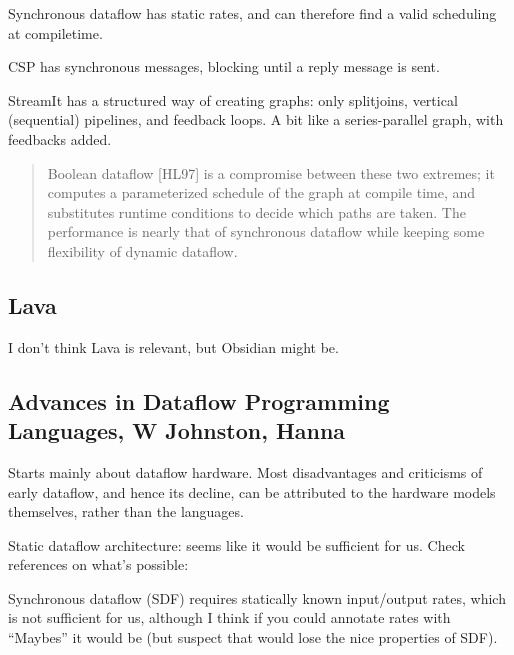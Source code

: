 Synchronous dataflow has static rates, and can therefore find a valid scheduling at compiletime.

CSP has synchronous messages, blocking until a reply message is sent.

StreamIt has a structured way of creating graphs: only splitjoins, vertical (sequential) pipelines, and feedback loops. A bit like a series-parallel graph, with feedbacks added.

\begin{quote}
Boolean dataflow [HL97] is a compromise between these two extremes; it computes a parameterized schedule
of the graph at compile time, and substitutes runtime conditions to decide which paths are taken.
The performance is nearly that of synchronous dataflow while keeping some flexibility of dynamic
dataflow.
\end{quote}


\subsection{Lava}
I don't think Lava is relevant, but Obsidian might be.

\subsection{Advances in Dataflow Programming Languages, W Johnston, Hanna}
Starts mainly about dataflow hardware\cite{johnston2004advances}.
Most disadvantages and criticisms of early dataflow, and hence its decline, can be attributed to the hardware models themselves, rather than the languages.

Static dataflow architecture:
seems like it would be sufficient for us. Check references on what's possible:

Synchronous dataflow (SDF) requires statically known input/output rates, which is not sufficient for us, although I think if you could annotate rates with ``Maybes'' it would be (but suspect that would lose the nice properties of SDF).

